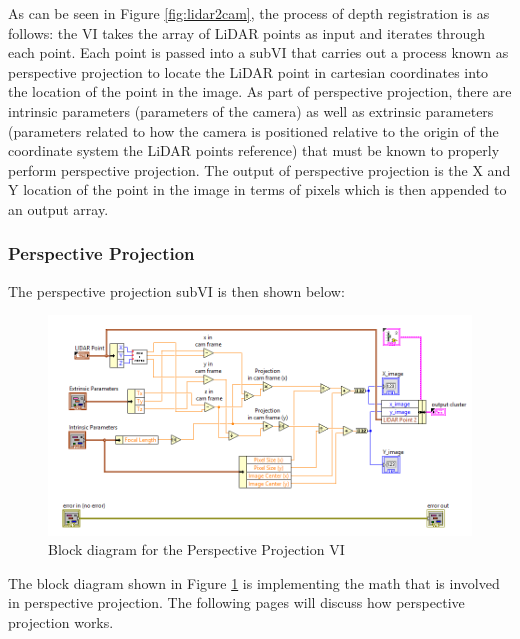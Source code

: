 \noindent As can be seen in Figure \ref{fig:lidar2cam}, the process of depth registration is as follows: the VI takes the array of LiDAR points as input and iterates through each point. Each point is passed into a subVI that carries out a process known as perspective projection to locate the LiDAR point in cartesian coordinates into the location of the point in the image. As part of perspective projection, there are intrinsic parameters (parameters of the camera) as well as extrinsic parameters (parameters related to how the camera is positioned relative to the origin of the coordinate system the LiDAR points reference) that must be known to properly perform perspective projection. The output of perspective projection is the X and Y location of the point in the image in terms of pixels which is then appended to an output array.

\newpage

\subsubsection{Perspective Projection}
The perspective projection subVI is then shown below:

\begin{figure}[h!]
\centering
\includegraphics[scale=0.65]{Photos/perspectiveprojection.png}
\caption{Block diagram for the Perspective Projection VI}
\label{fig:perspectiveprojection}
\end{figure}

\noindent The block diagram shown in Figure \ref{fig:perspectiveprojection} is implementing the math that is involved in perspective projection. The following pages will discuss how perspective projection works.

\newpage




